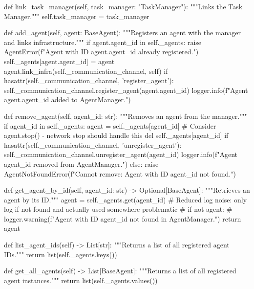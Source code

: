 \documentclass{amsbook}
\theoremstyle{definition}
\theoremstyle{remark}
\numberwithin{equation}{chapter} %
\begin{document}
\begin{python}
    def link_task_manager(self, task_manager: "TaskManager"):
        """Links the Task Manager."""
        self.task_manager = task_manager

    def add_agent(self, agent: BaseAgent):
        """Registers an agent with the manager and links infrastructure."""
        if agent.agent_id in self._agents:
            raise AgentError(f"Agent with ID {agent.agent_id} already registered.")
        self._agents[agent.agent_id] = agent
        agent.link_infra(self._communication_channel, self)
        if hasattr(self._communication_channel, 'register_agent'):
             self._communication_channel.register_agent(agent.agent_id)
        logger.info(f"Agent {agent.agent_id} added to AgentManager.")

    def remove_agent(self, agent_id: str):
        """Removes an agent from the manager."""
        if agent_id in self._agents:
            agent = self._agents[agent_id]
            # Consider agent.stop() - network stop should handle this
            del self._agents[agent_id]
            if hasattr(self._communication_channel, 'unregister_agent'):
                 self._communication_channel.unregister_agent(agent_id)
            logger.info(f"Agent {agent_id} removed from AgentManager.")
        else:
            raise AgentNotFoundError(f"Cannot remove: Agent with ID {agent_id} not found.")

    def get_agent_by_id(self, agent_id: str) -> Optional[BaseAgent]:
        """Retrieves an agent by its ID."""
        agent = self._agents.get(agent_id)
        # Reduced log noise: only log if not found and actually used somewhere problematic
        # if not agent:
        #      logger.warning(f"Agent with ID {agent_id} not found in AgentManager.")
        return agent

    def list_agent_ids(self) -> List[str]:
        """Returns a list of all registered agent IDs."""
        return list(self._agents.keys())

    def get_all_agents(self) -> List[BaseAgent]:
        """Returns a list of all registered agent instances."""
        return list(self._agents.values())


\end{python}
\end{document}
